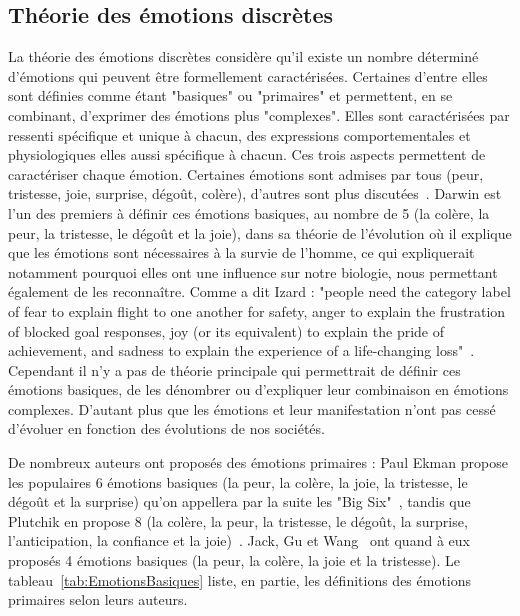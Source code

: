 \subsection{Théorie des émotions discrètes}
La théorie des émotions discrètes considère qu'il existe un nombre déterminé d'émotions qui peuvent être formellement caractérisées. Certaines d'entre elles sont définies comme étant "basiques" ou "primaires" et permettent, en se combinant, d'exprimer des émotions plus "complexes". Elles sont caractérisées par ressenti spécifique et unique à chacun, des expressions comportementales et physiologiques elles aussi spécifique à chacun. Ces trois aspects permettent de caractériser chaque émotion. Certaines émotions sont admises par tous (peur, tristesse, joie, surprise, dégoût, colère), d'autres sont plus discutées~\cite{Cosnier1994}.
Darwin est l'un des premiers à définir ces émotions basiques, au nombre de 5 (la colère, la peur, la tristesse, le dégoût et la joie), dans sa théorie de l'évolution où il explique que les émotions sont nécessaires à la survie de l'homme, ce qui expliquerait notamment pourquoi elles ont une influence sur notre biologie, nous permettant également de les reconnaître.
Comme a dit Izard : "people need the category label of fear to explain flight to one another for safety, anger to explain the frustration of blocked goal responses, joy (or its equivalent) to explain the pride of achievement, and sadness to explain the experience of a life-changing loss"~\cite{Izard2007}.
Cependant il n'y a pas de théorie principale qui permettrait de définir ces émotions basiques, de les dénombrer ou d'expliquer leur combinaison en émotions complexes. D'autant plus que les émotions et leur manifestation n'ont pas cessé d'évoluer en fonction des évolutions de nos sociétés.



De nombreux auteurs ont proposés des émotions primaires : Paul Ekman propose les populaires 6 émotions basiques (la peur, la colère, la joie, la tristesse, le dégoût et la surprise) qu'on appellera par la suite les "Big Six"~\cite{Ekman1999}, tandis que Plutchik en propose 8 (la colère, la peur, la tristesse, le dégoût, la surprise, l'anticipation, la confiance et la joie)~\cite{Plutchik1980}. Jack, Gu et Wang~\cite{Jack2016,Gu2015,Wang2016} ont quand à eux proposés 4 émotions basiques (la peur, la colère, la joie et la tristesse). Le tableau~\ref{tab:EmotionsBasiques} liste, en partie, les définitions des émotions primaires selon leurs auteurs.

